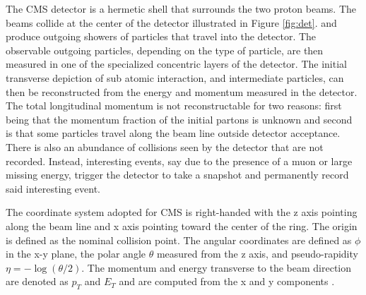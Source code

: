 The CMS detector is a hermetic shell that surrounds the two proton beams. The beams collide at the center of the detector illustrated in Figure \ref{fig:det}. and produce outgoing showers of particles that travel into the detector. The observable outgoing particles, depending on the type of particle, are then measured in one of the specialized concentric layers of the detector. The initial transverse depiction of sub atomic interaction, and intermediate particles, can then be reconstructed from the energy and momentum measured in the detector. The total longitudinal momentum is not reconstructable for two reasons: first being that the momentum fraction of the initial partons is unknown and second is that some particles travel along the beam line outside detector acceptance.  There is also an abundance of collisions seen by the detector that are not recorded. Instead, interesting events, say due to the presence of a muon or large missing energy, trigger the detector to take a snapshot and permanently record said interesting event.

The coordinate system adopted for CMS is right-handed with the z axis pointing along the beam line and x axis pointing toward the center of the ring. The origin is defined as the nominal collision point. The angular coordinates are defined as $\phi$ in the x-y plane, the polar angle $\theta$ measured from the z axis, and pseudo-rapidity $\eta =-\log(\theta/2)$. The momentum and energy transverse to the beam direction are denoted as $p_T$ and $E_T$ and are computed from the x and y components \cite{CMS:2017lum}. 

